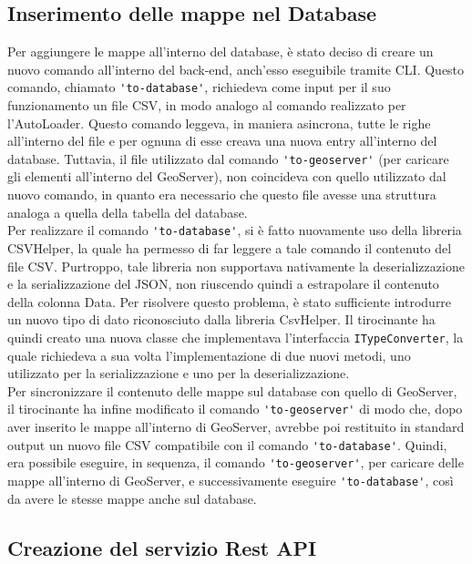 \subsection{Inserimento delle mappe nel Database}

Per aggiungere le mappe all'interno del database, è stato deciso di creare un nuovo comando all'interno del back-end, anch'esso eseguibile tramite CLI. Questo comando, chiamato \verb|'to-database'|, richiedeva come input per il suo funzionamento un file CSV, in modo analogo al comando realizzato per l'AutoLoader.
Questo comando leggeva, in maniera asincrona, tutte le righe all'interno del file e per ognuna di esse creava una nuova entry all'interno del database. Tuttavia, il file utilizzato dal comando \verb|'to-geoserver'| (per caricare gli elementi all'interno del GeoServer), non coincideva con quello utilizzato dal nuovo comando, in quanto era necessario che questo file avesse una struttura analoga a quella della tabella del database.
\\Per realizzare il comando  \verb|'to-database'|, si è fatto nuovamente uso della libreria CSVHelper, la quale ha permesso di far leggere a tale comando il contenuto del file CSV. Purtroppo, tale libreria non supportava nativamente la deserializzazione e la serializzazione del JSON, non riuscendo quindi a estrapolare il contenuto della colonna Data. Per risolvere questo problema, è stato sufficiente introdurre un nuovo tipo di dato riconosciuto dalla libreria CsvHelper. Il tirocinante ha quindi creato una nuova classe che implementava l'interfaccia  \verb|ITypeConverter|, la quale richiedeva a sua volta l'implementazione di due nuovi metodi, uno utilizzato per la serializzazione e uno per la deserializzazione.
\\Per sincronizzare il contenuto delle mappe sul database con quello di GeoServer, il tirocinante ha infine modificato il comando \verb|'to-geoserver'| di modo che, dopo aver inserito le mappe all'interno di GeoServer, avrebbe poi restituito in standard output un nuovo file CSV compatibile con il comando \verb|'to-database'|. Quindi, era possibile eseguire, in sequenza, il comando \verb|'to-geoserver'|, per caricare delle mappe all'interno di GeoServer, e successivamente eseguire \verb|'to-database'|, così da avere le stesse mappe anche sul database.

\subsection{Creazione del servizio Rest API}


